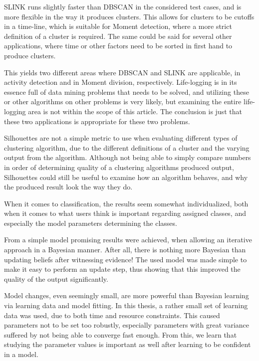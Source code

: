 SLINK runs slightly faster than DBSCAN in the considered test cases, and 
is more flexible in the way it produces clusters. This allows for clusters to 
be cutoffs in a time-line, which is suitable for Moment detection, where a more 
strict definition of a cluster is required. The same could be said for several 
other applications, where time or other factors need to be sorted in first hand 
to produce clusters. 

This yields two different areas where DBSCAN and SLINK are applicable, in
activity detection and in Moment division, respectively. Life-logging is in 
its essence full of data mining problems that needs to be solved, and utilizing
these or other algorithms on other problems is very likely, but examining the
entire life-logging area is not within the scope of this article. The conclusion
is just that these two applications is appropriate for these two problems.

Silhouettes are not a simple metric to use when evaluating different types of
clustering algorithm, due to the different definitions of a cluster and the
varying output from the algorithm. Although not being able to simply compare
numbers in order of determining quality of a clustering algorithms produced
output, Silhouettes could still be useful to examine how an algorithm behaves,
and why the produced result look the way they do. 


When it comes to classification, the results seem somewhat individualized, 
both when it comes to what users think is important regarding assigned classes, 
and especially the model parameters determining the classes. 

From a simple model promising results were achieved, when allowing an iterative 
approach in a Bayesian manner. After all, there is nothing more Bayesian than 
updating beliefs after witnessing evidence! The used model was made simple to 
make it easy to perform an update step, thus showing that this improved the 
quality of the output significantly. 

Model changes, even seemingly small, are more powerful than Bayesian learning 
via learning data and model fitting. In this thesis, a rather small set of
learning data was used, due to both time and resource constraints. This caused
parameters not to be set too robustly, especially parameters with great 
variance suffered by not being able to converge fast enough. From this, we 
learn that studying the parameter values is important as well after learning
to be confident in a model.

